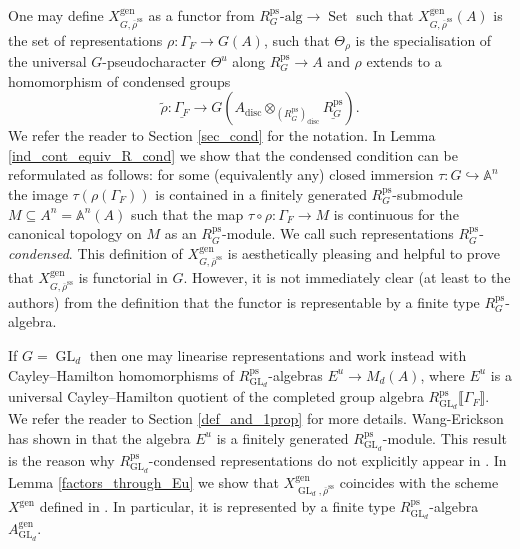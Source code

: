 \documentclass{amsart}
\theoremstyle{definition}
\theoremstyle{remark}
\DeclareMathOperator{\GL}{GL}
\DeclareMathOperator{\Set}{Set}
\newcommand{\br}[1]{\llbracket #1\rrbracket}
\newcommand{\alg}{\mathrm{alg}}
\newcommand{\rhobar}{\overline{\rho}}
\newcommand{\ps}{\mathrm{ps}}
\newcommand{\gen}{\mathrm{gen}}
\newcommand{\rhobarss}{\rhobar^{\mathrm{ss}}}
\newcommand{\disc}{\operatorname{disc}} %
\begin{document}
One may define $X^{\gen}_{G, \rhobarss}$ as a functor from $R^{\ps}_G\text{-}\alg\rightarrow \Set$ 
such that $X^{\gen}_{G, \rhobarss}(A)$ is the set of representations $\rho: \Gamma_F \rightarrow G(A)$, 
such that $\Theta_{\rho}$ is the specialisation of the universal $G$-pseudocharacter $\Theta^u$ along 
$R^{\ps}_G\rightarrow A$ and $\rho$ extends to a homomorphism of condensed groups
$$ \tilde{\rho}: \underline{\Gamma_F} \rightarrow G(A_{\disc}\otimes_{(R^{\ps}_G)_{\disc}} \underline{R^{\ps}_G}).$$
We refer the reader to Section \ref{sec_cond} for the notation. In Lemma \ref{ind_cont_equiv_R_cond} we show that 
the condensed condition can be reformulated as follows: for some (equivalently any) closed immersion 
$\tau: G\hookrightarrow \mathbb A^n$ the image $\tau(\rho(\Gamma_F))$ is contained in a finitely generated 
$R^{\ps}_G$-submodule $M \subseteq A^n = \mathbb A^n(A)$ such that the map $\tau\circ \rho: \Gamma_F \rightarrow M$ 
is continuous for the canonical topology on $M$ as an $R^{\ps}_G$-module. We call such representations $R^{\ps}_G$-\emph{condensed}. This definition 
of $X^{\gen}_{G, \rhobarss}$ is aesthetically pleasing and helpful 
to prove that $X^{\gen}_{G, \rhobarss}$ is functorial in $G$. However, it is
not immediately clear (at least to the authors) from the definition that the functor is representable by a finite type $R^{\ps}_G$-algebra. 

If $G=\GL_d$ then one may linearise representations and work instead with Cayley--Hamilton homomorphisms of $R^{\ps}_{\GL_d}$-algebras $E^{u}\rightarrow M_d(A)$, where
$E^u$ is a universal Cayley--Hamilton quotient of the completed 
group algebra $R^{\ps}_{\GL_d}\br{\Gamma_F}$. We refer the reader to Section \ref{def_and_1prop} for more details. Wang-Erickson has shown in \cite{WE_alg} that the algebra $E^u$ is a finitely generated $R^{\ps}_{\GL_d}$-module.
This result is the reason why $R^{\ps}_{\GL_d}$-condensed representations do not explicitly appear in \cite{BIP_new}. In Lemma \ref{factors_through_Eu}
we show that $X^{\gen}_{\GL_d, \rhobarss}$ coincides with the scheme $X^{\gen}$
defined in \cite{BIP_new}. In particular, it is represented by a finite 
type $R^{\ps}_{\GL_d}$-algebra $A^{\gen}_{\GL_d}$. 
\end{document}
